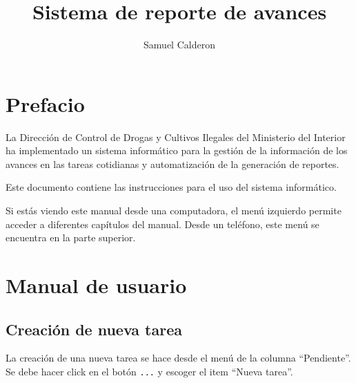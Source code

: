 \documentclass[
  letterpaper,
  DIV=11,
  numbers=noendperiod]{scrreprt}
\title{Sistema de reporte de avances}
\author{Samuel Calderon}
\date{}
\renewcommand*\contentsname{Table of contents}
\newcommand\contentsname{Table of contents}
\begin{document}
\maketitle
\ifdefined\Shaded\renewenvironment{Shaded}{\begin{tcolorbox}[borderline west={3pt}{0pt}{shadecolor}, breakable, sharp corners, interior hidden, enhanced, boxrule=0pt, frame hidden]}{\end{tcolorbox}}\fi

\renewcommand*\contentsname{Table of contents}
{
\hypersetup{linkcolor=}
\setcounter{tocdepth}{2}
\tableofcontents
}

\hypertarget{prefacio}{%
\chapter*{Prefacio}\label{prefacio}}


La Dirección de Control de Drogas y Cultivos Ilegales del Ministerio del
Interior ha implementado un sistema informático para la gestión de la
información de los avances en las tareas cotidianas y automatización de
la generación de reportes.

Este documento contiene las instrucciones para el uso del sistema
informático.

Si estás viendo este manual desde una computadora, el menú izquierdo
permite acceder a diferentes capítulos del manual. Desde un teléfono,
este menú se encuentra en la parte superior.


\hypertarget{manual-de-usuario}{%
\chapter{Manual de usuario}\label{manual-de-usuario}}

\hypertarget{creaciuxf3n-de-nueva-tarea}{%
\section{Creación de nueva tarea}\label{creaciuxf3n-de-nueva-tarea}}

La creación de una nueva tarea se hace desde el menú de la columna
``Pendiente''. Se debe hacer click en el botón \texttt{...} y escoger el
item ``Nueva tarea''.
\end{document}
